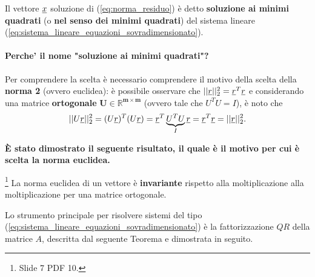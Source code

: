 \begin{definition}\label{def:soluzione_minimi_quadrati}
    Il vettore $\uline x$ soluzione di (\ref{eq:norma_residuo}) è detto \textbf{soluzione ai minimi quadrati} (o \textbf{nel senso dei minimi quadrati}) del sistema lineare (\ref{eq:sistema_lineare_equazioni_sovradimensionato}). 
\end{definition}

\paragraph{Perche' il nome "soluzione ai minimi quadrati"?} Per comprendere la scelta è necessario comprendere il motivo della scelta della \textbf{norma 2} (ovvero euclidea): è possibile osservare che $||\uline r||_2^2=\uline r^T\uline r$ e considerando una matrice \textbf{ortogonale} $\boldsymbol{U\in\mathbb R^{m\times m}}$ (ovvero tale che $U^TU=I$), è noto che 
\begin{equation*}
    ||U\uline r||_2^2=(U\uline r)^T(U\uline r)=\uline r^T\underbrace{U^TU}_I \uline r = \uline r^T\uline r = ||\uline r||_2^2.
\end{equation*}

\textbf{È stato dimostrato il seguente risultato, il quale è il motivo per cui è scelta la norma euclidea.}

\begin{theorem}\footnote{Slide 7 PDF 10.}
    La norma euclidea di un vettore è \textbf{invariante} rispetto alla moltiplicazione alla moltiplicazione per una matrice ortogonale.
\end{theorem}

Lo strumento principale per risolvere sistemi del tipo (\ref{eq:sistema_lineare_equazioni_sovradimensionato}) è la fattorizzazione $QR$ della matrice $A$, descritta dal seguente Teorema e dimostrata in seguito.

